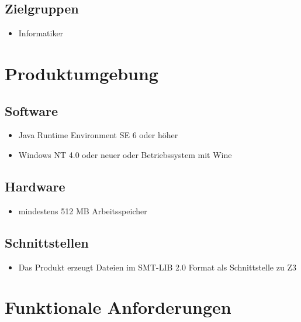 \documentclass[a4paper,10pt]{article}
\begin{document}
\subsection{Zielgruppen}
\begin{itemize}
  \item Informatiker
\end{itemize}

\section{Produktumgebung}
\subsection{Software}
\begin{itemize}
  \item Java Runtime Environment SE 6 oder höher
  \item Windows NT 4.0 oder neuer oder Betriebssystem mit Wine
\end{itemize}

\subsection{Hardware}
\begin{itemize}
  \item mindestens 512 MB Arbeitsspeicher
\end{itemize}

\subsection{Schnittstellen}
\begin{itemize}
  \item Das Produkt erzeugt Dateien im SMT-LIB 2.0 Format als Schnittstelle zu Z3
\end{itemize}

\section{Funktionale Anforderungen}
\end{document}
